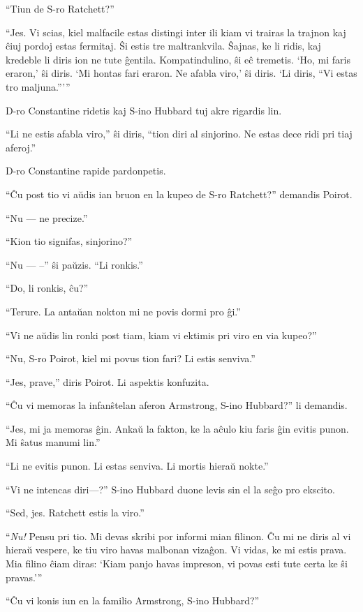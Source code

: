 ``Tiun de S-ro Ratchett?''

``Jes. Vi scias, kiel malfacile estas distingi inter ili kiam vi trairas la trajnon kaj ĉiuj pordoj estas fermitaj. Ŝi estis tre maltrankvila. Ŝajnas, ke li ridis, kaj kredeble li diris ion ne tute ĝentila. Kompatindulino, ŝi eĉ tremetis. `Ho, mi faris eraron,' ŝi diris. `Mi hontas fari eraron. Ne afabla viro,' ŝi diris. `Li diris, ``Vi estas tro maljuna.'''''

D-ro Constantine ridetis kaj S-ino Hubbard tuj akre rigardis lin.

``Li ne estis afabla viro,'' ŝi diris, ``tion diri al sinjorino. Ne estas dece ridi pri tiaj aferoj.''

D-ro Constantine rapide pardonpetis.

``Ĉu post tio vi aŭdis ian bruon en la kupeo de S-ro Ratchett?'' demandis Poirot.

``Nu --- ne precize.''

``Kion tio signifas, sinjorino?''

``Nu --- --'' ŝi paŭzis. ``Li ronkis.''

``Do, li ronkis, ĉu?''

``Terure. La antaŭan nokton mi ne povis dormi pro ĝi.''

``Vi ne aŭdis lin ronki post tiam, kiam vi ektimis pri viro en via kupeo?''

``Nu, S-ro Poirot, kiel mi povus tion fari? Li estis senviva.''

``Jes, prave,'' diris Poirot. Li aspektis konfuzita.

``Ĉu vi memoras la infanŝtelan aferon Armstrong, S-ino Hubbard?'' li demandis.

``Jes, mi ja memoras ĝin. Ankaŭ la fakton, ke la aĉulo kiu faris ĝin evitis punon. Mi ŝatus manumi lin.''

``Li ne evitis punon. Li estas senviva. Li mortis hieraŭ nokte.''

``Vi ne intencas diri---?'' S-ino Hubbard duone levis sin el la seĝo pro ekscito.

``Sed, jes. Ratchett estis la viro.''

``\emph{Nu!} Pensu pri tio. Mi devas skribi por informi mian filinon. Ĉu mi ne diris al vi hieraŭ vespere, ke tiu viro havas malbonan vizaĝon. Vi vidas, ke mi estis prava. Mia filino ĉiam diras: `Kiam panjo havas impreson, vi povas esti tute certa ke ŝi pravas.'''

``Ĉu vi konis iun en la familio Armstrong, S-ino Hubbard?''

